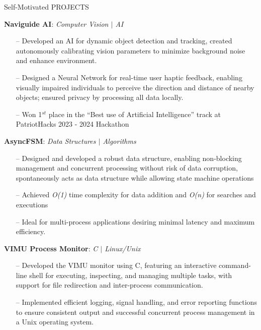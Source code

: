 \documentclass{resume} %
\begin{document}
\begin{rSection}{Self-Motivated PROJECTS}
\vspace{-0.75em}
\item{\textbf{Naviguide AI}}: \textit{Computer Vision $\vert$ AI} \vspace{0.5em}\\
\begin{itemize}
\vspace{-2em}
\itemsep -3pt
\item[--] Developed an AI for dynamic object detection and tracking, created autonomously calibrating vision parameters to minimize background noise and enhance environment.
\item[--] Designed a Neural Network for real-time user haptic feedback, enabling visually impaired individuals to perceive the direction and distance of nearby objects; ensured privacy by processing all data locally.
\item[--] Won 1\(^{st}\) place in the ``Best use of Artificial Intelligence'' track at PatriotHacks 2023 - 2024 Hackathon
\end{itemize}

\item{\textbf{AsyncFSM}}: \textit{Data Structures $\vert$ Algorithms} \vspace{0.5em} \\
\begin{itemize}
\vspace{-2em}
\itemsep -3pt
\item[--] Designed and developed a robust data structure, enabling non-blocking management and concurrent processing without risk of data corruption, spontaneously acts as data structure while allowing state machine operations
\item[--] Achieved \textit{O(1)} time complexity for data addition and \textit{O(n)} for searches and executions
\item[--] Ideal for multi-process applications desiring minimal latency and maximum efficiency.
\end{itemize}

\item{\textbf{VIMU Process Monitor}}: \textit{C $\vert$ Linux/Unix} \vspace{0.5em} \\
\begin{itemize}
\vspace{-2em}
\itemsep -3pt
\item[--] Developed the VIMU monitor using C, featuring an interactive command-line shell for executing, inspecting, and managing multiple tasks, with support for file redirection and inter-process communication.
\item[--] Implemented efficient logging, signal handling, and error reporting functions to ensure consistent output and successful concurrent process management in a Unix operating system.
\end{itemize}


\end{rSection}
\end{document}
